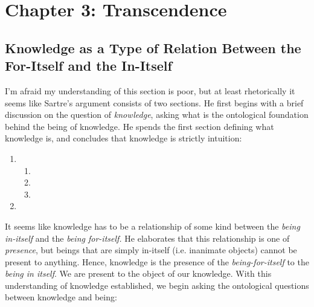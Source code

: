 \section{Chapter 3: Transcendence}

\subsection{Knowledge as a Type of Relation Between the For-Itself and the In-Itself}

I'm afraid my understanding of this section is poor, but at least rhetorically it seems like Sartre's argument consists of two sections. He first begins with a brief discussion on the question of \emph{knowledge}, asking what is the ontological foundation behind the being of knowledge. He spends the first section defining what knowledge is, and concludes that knowledge is strictly intuition:

\begin{enumerate}
  \item {}
  \begin{enumerate}
    \item {}
    \item {}
    \item {}
  \end{enumerate}
  \item {}
\end{enumerate}

It seems like knowledge has to be a relationship of some kind between the \emph{being in-itself} and the \emph{being for-itself.} He elaborates that this relationship is one of \emph{presence}, but beings that are simply in-itself (i.e. inanimate objects) cannot be present to anything. Hence, knowledge is the presence of the \emph{being-for-itself} to the \emph{being in itself}. We are present to the object of our knowledge. With this understanding of knowledge established, we begin asking the ontological questions between knowledge and being:

